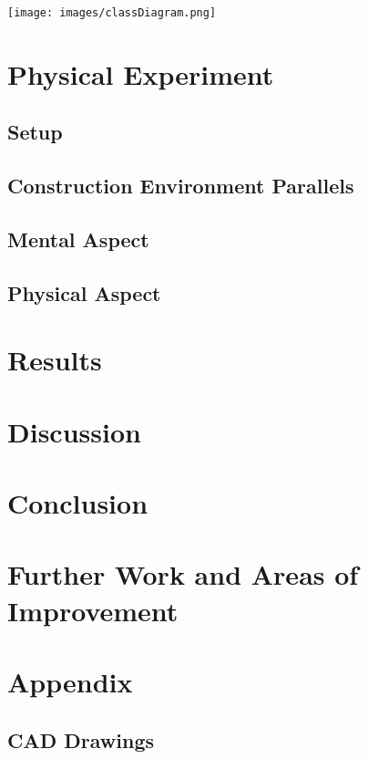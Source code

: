 \documentclass[11pt]{article}
\begin{document}
\begin{landscape}

\begin{center}
\texttt{[image: images/classDiagram.png]}
\label{figure:classDiagram}
\end{center}


\end{landscape}



\section{Physical Experiment}
\subsection{Setup}
\subsection{Construction Environment Parallels}
\subsection{Mental Aspect}
\subsection{Physical Aspect}

\section{Results}

\section{Discussion}
\section{Conclusion}
\section{Further Work and Areas of Improvement}




\section{Appendix}
\subsection{CAD Drawings}
\end{document}
